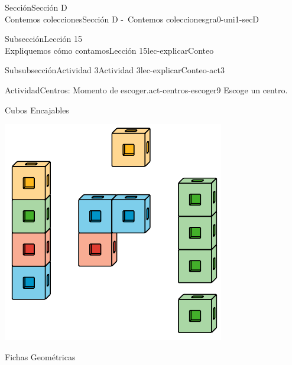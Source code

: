 \begin{sectionptx}{Sección}{{\Large Sección D\\}Contemos colecciones}{}{Sección D -~Contemos colecciones}{}{}{gra0-uni1-secD}
\begin{subsectionptx}{Subsección}{{\normalsize Lección 15\\[-0.05cm]}Expliquemos cómo contamos}{}{Lección 15}{}{}{lec-explicarConteo}
\begin{subsubsectionptx}{Subsubsección}{Actividad 3}{}{Actividad 3}{}{}{lec-explicarConteo-act3}
\begin{activity}{Actividad}{Centros: Momento de escoger.}{act-centros-escoger9}%
Escoge un centro.%
\begin{sidebyside}{2}{0.025}{0.025}{0.05}%
\begin{sbspanel}{0.45}%
Cubos Encajables%
\par
\includegraphics[max width=\linewidth, center]{external/svg-source/tikz-file-128850.pdf}
\end{sbspanel}%
\begin{sbspanel}{0.45}%
Fichas Geométricas%
\par

\end{sbspanel}
\end{sidebyside}
\end{activity}
\end{subsubsectionptx}
\end{subsectionptx}
\end{sectionptx}
